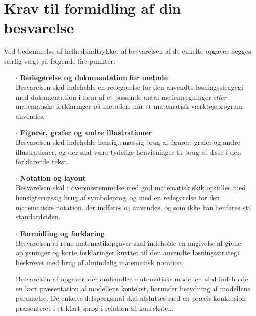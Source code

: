\documentclass[12pt,x11names,a4paper]{article}
\begin{document}


\begin{center}
\end{center}

\section*{Krav til formidling af din besvarelse}

Ved bedømmelse af helhedsindtrykket af besvarelsen af de enkelte opgaver lægges særlig vægt på følgende fire punkter:
\begin{itemize}
\item[$\cdot$] \textbf{Redegørelse og dokumentation for metode} \\
Besvarelsen skal indeholde en redegørelse for den anvendte løsningsstragegi med dokumentation i form af et passende antal mellemregninger \textit{eller} matematiske forklaringer på metoden, når et matematisk værktøjsprogram anvendes.
\item[$\cdot$] \textbf{Figurer, grafer og andre illustrationer} \\
Besvarelsen skal indeholde hensigtsmæssig brug af figurer, grafer og andre illustrationer, og der skal være tydelige henvisninger til brug af disse i den forklarende tekst.
\item[$\cdot$] \textbf{Notation og layout}\\
Besvarelsen skal i overensstemmelse med god matematisk skik opstilles med hensigtsmæssig brug af symbolsprog, og med en redegørelse for den matematiske notation, der indføres og anvendes, og som ikke kan henføres stil standardviden.
\item[$\cdot$] \textbf{Formidling og forklaring}\\
Besvarelsen af rene matematikopgaver skal indeholde en angivelse af givne oplysninger og korte forklaringer knyttet til den anvendte løsningsstrategi beskrevet med brug af almindelig matematisk notation. 

Besvarelsen af opgaver, der omhandler matematiske modeller, skal indeholde en kort præsentation af modellens kontekst, herunder betydning af modellens parametre. De enkelte delspørgsmål skal afsluttes med en præcis konklusion præsenteret i et klart sprog i relation til konteksten.
\end{itemize}
\end{document}
